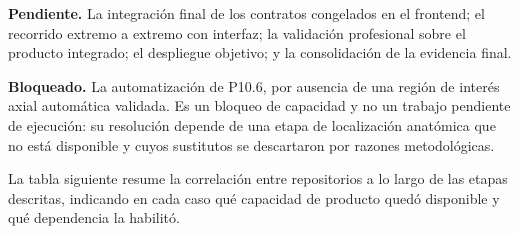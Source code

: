 \textbf{Pendiente.} La integración final de los contratos congelados en el frontend; el recorrido extremo a extremo con interfaz; la validación profesional sobre el producto integrado; el despliegue objetivo; y la consolidación de la evidencia final.

\textbf{Bloqueado.} La automatización de P10.6, por ausencia de una región de interés axial automática validada. Es un bloqueo de capacidad y no un trabajo pendiente de ejecución: su resolución depende de una etapa de localización anatómica que no está disponible y cuyos sustitutos se descartaron por razones metodológicas.

La tabla siguiente resume la correlación entre repositorios a lo largo de las etapas descritas, indicando en cada caso qué capacidad de producto quedó disponible y qué dependencia la habilitó.

